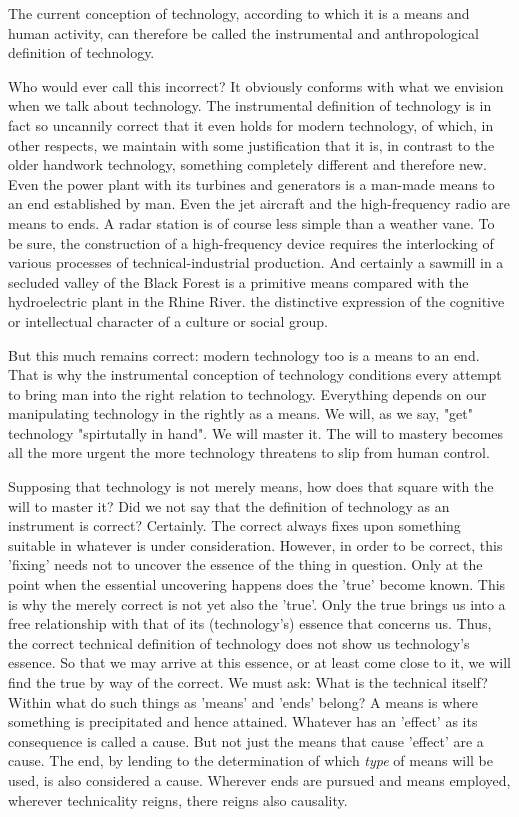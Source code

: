 \documentclass[12pt]{article}
\begin{document}
The current conception of technology, according to which it is a means and human activity, can therefore be called the instrumental and anthropological definition of technology.

Who would ever call this incorrect? It obviously conforms with what we envision when we talk about technology. The instrumental definition of technology is in fact so uncannily correct that it even holds for modern technology, of which, in other respects, we maintain with some justification that it is, in contrast to the older handwork technology, something completely different and therefore new. Even the power plant with its turbines and generators is a man-made means to an end established by man. Even the jet aircraft and the high-frequency radio are means to ends. A radar station is of course less simple than a weather vane. To be sure, the construction of a high-frequency device requires the interlocking of various processes of technical-industrial production. And certainly a sawmill in a secluded valley of the Black Forest is a primitive means compared with the hydroelectric plant in the Rhine River.
the distinctive expression of the cognitive or intellectual character of a culture or social group.

But this much remains correct: modern technology too is a means to an end. That is why the instrumental conception of technology conditions every attempt to bring man into the right relation to technology. Everything depends on our manipulating technology in the rightly as a means. We will, as we say, "get" technology "spirtutally in hand". We will master it. The will to mastery becomes all the more urgent the more technology threatens to slip from human control.

Supposing that technology is not merely means, how does that square with the will to master it? Did we not say that the definition of technology as an instrument is correct? Certainly. The correct always fixes upon something suitable in whatever is under consideration. However, in order to be correct, this 'fixing' needs not to uncover the essence of the thing in question. Only at the point when the essential uncovering happens does the 'true' become known. This is why the merely correct is not yet also the 'true'. Only the true brings us into a free relationship with that of its (technology's) essence that concerns us. Thus, the correct technical definition of technology does not show us technology's essence. So that we may arrive at this essence, or at least come close to it, we will find the true by way of the correct. We must ask: What is the technical itself? Within what do such things as 'means' and 'ends' belong? A means is where something is precipitated and hence attained. Whatever has an 'effect' as its consequence is called a cause. But not just the means that cause 'effect' are a cause. The end, by lending to the determination of which \textit{type} of means will be used, is also considered a cause. Wherever ends are pursued and means employed, wherever technicality reigns, there reigns also causality.
\end{document}
